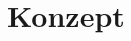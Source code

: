 \documentclass[index.tex]{subfiles}
\begin{document}
\makeatother
\chapter*{Konzept}
\makeatother
\end{document}

